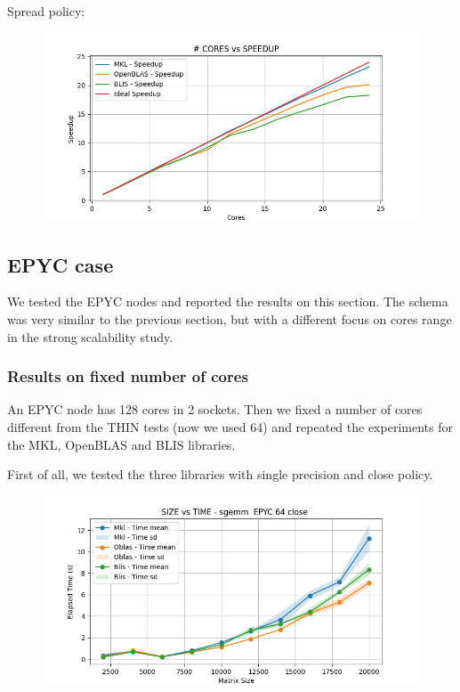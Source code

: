 \documentclass[12pt, titlepage]{report}
\begin{document}
Spread policy:
\begin{figure}[H]
    \centering
    \includegraphics[width=\textwidth]{THIN speedUp/dgemm_mkl.x_THIN_10000_spread_detailed__speedUp.png}
\end{figure}

\subsection{EPYC case}
We tested the EPYC nodes and reported the results on this section. The schema was very similar to the previous section, but with a different focus on cores range in the strong scalability study. 

\subsubsection{Results on fixed number of cores}
An EPYC node has 128 cores in 2 sockets. Then we fixed a number of cores different from the THIN tests (now we used 64) and repeated the experiments for the MKL, OpenBLAS and BLIS libraries.   

First of all, we tested the three libraries with single precision and close policy.
\begin{figure}[H]
    \centering
    \includegraphics[width=\textwidth]{EPYC 64/sgemm__EPYC_64_close_time.png}
\end{figure}
\end{document}
